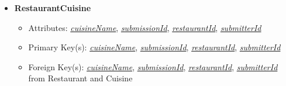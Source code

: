 \documentclass{article}
\begin{document}
\begin{itemize}
        \item \textbf{RestaurantCuisine}
        \begin{itemize}
            \item Attributes: \underline{\textit{cuisineName}}, \underline{\textit{submissionId}}, \underline{\textit{restaurantId}}, \underline{\textit{submitterId}}
            \item Primary Key(s): \underline{\textit{cuisineName}}, \underline{\textit{submissionId}}, \underline{\textit{restaurantId}}, \underline{\textit{submitterId}}
            \item Foreign Key(s): \underline{\textit{cuisineName}}, \underline{\textit{submissionId}}, \underline{\textit{restaurantId}}, \underline{\textit{submitterId}} from Restaurant and Cuisine
        \end{itemize}

    \end{itemize}
    
\end{document}
